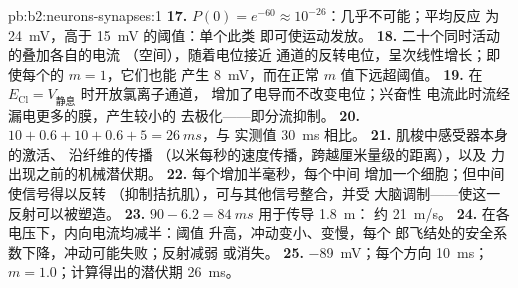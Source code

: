 \begin{solution}{pb:b2:neurons-synapses:1}
\textbf{17.} $P(0) = e^{-60} \approx 10^{-26}$：几乎不可能；平均反应
为 \qty{24}{mV}，高于 \qty{15}{mV} 的阈值：单个此类
即可使运动发放。
\textbf{18.} 二十个同时活动的叠加各自的电流
（空间），随着电位接近
通道的反转电位，呈次线性增长；即使每个的 $m = 1$，它们也能
产生 \qty{8}{mV}，而在正常 $m$ 值下远超阈值。
\textbf{19.} 在 $E_{\mathrm{Cl}} = V_{\text{静息}}$ 时开放氯离子通道，
增加了电导而不改变电位；兴奋性
电流此时流经漏电更多的膜，产生较小的
去极化——即分流抑制。
\textbf{20.} $10 + 0.6 + 10 + 0.6 + 5 = \qty{26}{ms}$，与
实测值 \qty{30}{ms} 相比。
\textbf{21.} 肌梭中感受器本身的激活、
沿纤维的传播
（以米每秒的速度传播，跨越厘米量级的距离），以及
力出现之前的机械潜伏期。
\textbf{22.} 每个增加半毫秒，每个中间
增加一个细胞；但中间使信号得以反转
（抑制拮抗肌），可与其他信号整合，并受
大脑调制——使这一反射可以被塑造。
\textbf{23.} $90 - 6.2 = \qty{84}{ms}$ 用于传导 \qty{1.8}{m}：
约 \qty{21}{m/s}。
\textbf{24.} 在各电压下，内向电流均减半：阈值
升高，冲动变小、变慢，每个
郎飞结处的安全系数下降，冲动可能失败；反射减弱
或消失。
\textbf{25.}  \qty{-89}{mV}；每个方向 \qty{10}{ms}；
$m = 1.0$；计算得出的潜伏期 \qty{26}{ms}。
\end{solution}
